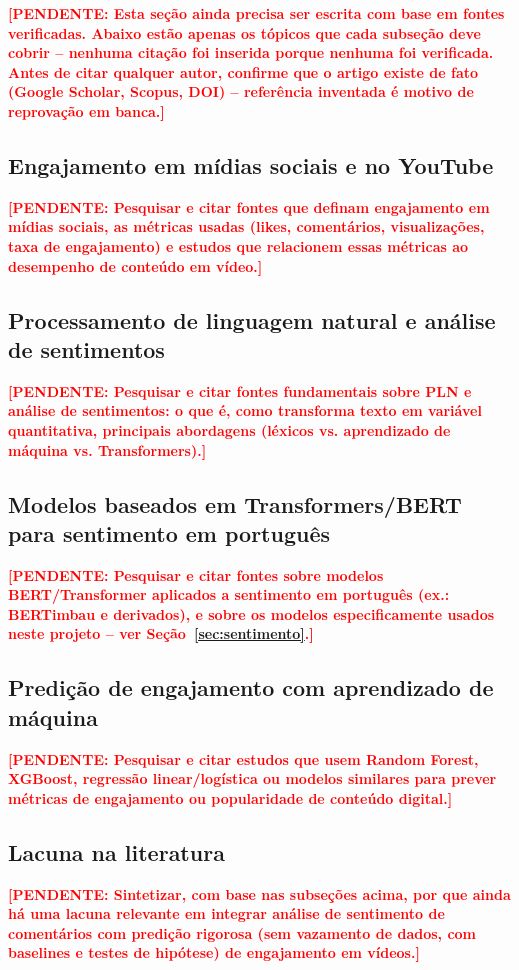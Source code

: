 \documentclass[12pt,a4paper]{article}
\newcommand{\pendente}[1]{\textcolor{red}{\textbf{[PENDENTE: #1]}}}
\begin{document}
\pendente{Esta seção ainda precisa ser escrita com base em fontes verificadas. Abaixo estão apenas os tópicos que cada subseção deve cobrir -- nenhuma citação foi inserida porque nenhuma foi verificada. Antes de citar qualquer autor, confirme que o artigo existe de fato (Google Scholar, Scopus, DOI) -- referência inventada é motivo de reprovação em banca.}

\subsection{Engajamento em mídias sociais e no YouTube}
\pendente{Pesquisar e citar fontes que definam engajamento em mídias sociais, as métricas usadas (likes, comentários, visualizações, taxa de engajamento) e estudos que relacionem essas métricas ao desempenho de conteúdo em vídeo.}

\subsection{Processamento de linguagem natural e análise de sentimentos}
\pendente{Pesquisar e citar fontes fundamentais sobre PLN e análise de sentimentos: o que é, como transforma texto em variável quantitativa, principais abordagens (léxicos vs. aprendizado de máquina vs. Transformers).}

\subsection{Modelos baseados em Transformers/BERT para sentimento em português}
\pendente{Pesquisar e citar fontes sobre modelos BERT/Transformer aplicados a sentimento em português (ex.: BERTimbau e derivados), e sobre os modelos especificamente usados neste projeto -- ver Seção~\ref{sec:sentimento}.}

\subsection{Predição de engajamento com aprendizado de máquina}
\pendente{Pesquisar e citar estudos que usem Random Forest, XGBoost, regressão linear/logística ou modelos similares para prever métricas de engajamento ou popularidade de conteúdo digital.}

\subsection{Lacuna na literatura}
\pendente{Sintetizar, com base nas subseções acima, por que ainda há uma lacuna relevante em integrar análise de sentimento de comentários com predição rigorosa (sem vazamento de dados, com baselines e testes de hipótese) de engajamento em vídeos.}
\end{document}
